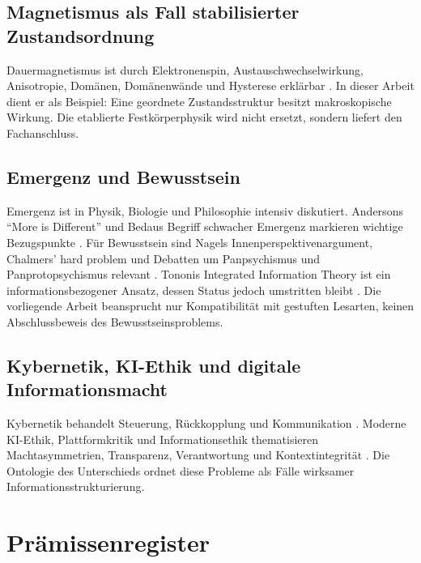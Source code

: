 \documentclass[11pt,a4paper]{article}
\theoremstyle{remark}
\begin{document}
\subsection{Magnetismus als Fall stabilisierter Zustandsordnung}
Dauermagnetismus ist durch Elektronenspin, Austauschwechselwirkung, Anisotropie, Domänen, Domänenwände und Hysterese erklärbar \parencite{kittel2005,coey2010}. In dieser Arbeit dient er als Beispiel: Eine geordnete Zustandsstruktur besitzt makroskopische Wirkung. Die etablierte Festkörperphysik wird nicht ersetzt, sondern liefert den Fachanschluss.

\subsection{Emergenz und Bewusstsein}
Emergenz ist in Physik, Biologie und Philosophie intensiv diskutiert. Andersons \enquote{More is Different} und Bedaus Begriff schwacher Emergenz markieren wichtige Bezugspunkte \parencite{anderson1972,bedau1997}. Für Bewusstsein sind Nagels Innenperspektivenargument, Chalmers' hard problem und Debatten um Panpsychismus und Panprotopsychismus relevant \parencite{nagel1974,chalmers1996,seager1995,strawson2006,goff2017}. Tononis Integrated Information Theory ist ein informationsbezogener Ansatz, dessen Status jedoch umstritten bleibt \parencite{tononi2004,oizumi2014}. Die vorliegende Arbeit beansprucht nur Kompatibilität mit gestuften Lesarten, keinen Abschlussbeweis des Bewusstseinsproblems.

\subsection{Kybernetik, KI-Ethik und digitale Informationsmacht}
Kybernetik behandelt Steuerung, Rückkopplung und Kommunikation \parencite{wiener1948,wiener1950}. Moderne KI-Ethik, Plattformkritik und Informationsethik thematisieren Machtasymmetrien, Transparenz, Verantwortung und Kontextintegrität \parencite{nissenbaum2010,floridi2011,bostrom2014,russell2019,oneil2016}. Die Ontologie des Unterschieds ordnet diese Probleme als Fälle wirksamer Informationsstrukturierung.

\section{Prämissenregister}
\end{document}
